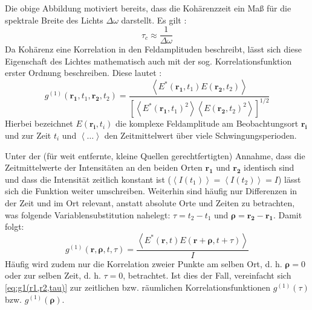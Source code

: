 Die obige Abbildung motiviert bereits, dass die Kohärenzzeit ein Maß für die spektrale Breite des Lichts $\Delta \omega$ darstellt. 
Es gilt \cite{foxQuantumOpticsIntroduction2006}:
\begin{equation}
    \tau_c  \approx \frac{1}{\Delta \omega}
    \label{eq:tau(delta nu)}
\end{equation}
Da Kohärenz eine Korrelation in den Feldamplituden beschreibt, lässt sich diese Eigenschaft des Lichtes mathematisch auch mit der sog. Korrelationsfunktion erster Ordnung beschreiben. 
Diese lautet \cite{foellmiIntensityInterferometrySecondorder2009}:
\begin{equation}
    g^{(1)}(\mathbf{r_1}, t_1, \mathbf{r_2}, t_2) = \frac{\left<E^*(\mathbf{r_1}, t_1)E(\mathbf{r_2}, t_2)\right>}{\left[\left<E^*(\mathbf{r_1}, t_1)^2\right> \left<E(\mathbf{r_2}, t_2)^2\right>\right]^{1/2}}
    \label{eq:g1(r1,t1,r2,t2)}
\end{equation}
Hierbei bezeichnet $E(\mathbf{r_i},t_i)$ die komplexe Feldamplitude am Beobachtungsort $\mathbf{r_i}$ und zur Zeit $t_i$ und $\left<\dots\right>$ den Zeitmittelwert über viele Schwingungsperioden. 

Unter der (für weit entfernte, kleine Quellen gerechtfertigten) Annahme, dass die Zeitmittelwerte der Intensitäten an den beiden Orten $\mathbf{r_1}$ und $\mathbf{r_2}$ identisch sind und dass die Intensität zeitlich konstant ist ($\left<I(t_1)\right>=\left<I(t_2)\right>=I$) lässt sich die Funktion weiter umschreiben. 
Weiterhin sind häufig nur Differenzen in der Zeit und im Ort relevant, anstatt absolute Orte und Zeiten zu betrachten, was folgende Variablensubstitution nahelegt: $\tau = t_2 -t_1$ und $\bm{\rho} = \mathbf{r_2} - \mathbf{r_1}$. 
Damit folgt:
\begin{equation}
    g^{(1)}(\mathbf{r}, \bm{\rho}, t, \tau) = \frac{\left<E^*(\mathbf{r}, t)E(\mathbf{r}+\bm{\rho}, t+\tau)\right>}{I}
    \label{eq:g1(r1,r2,tau)}
\end{equation}
Häufig wird zudem nur die Korrelation zweier Punkte am selben Ort, d. h. $\bm{\rho}=0$ oder zur selben Zeit, d. h. $\tau=0$, betrachtet. 
Ist dies der Fall, vereinfacht sich \autoref{eq:g1(r1,r2,tau)} zur zeitlichen bzw. räumlichen Korrelationsfunktionen $g^{(1)}(\tau)$ bzw. $g^{(1)}(\bm{\rho})$.


